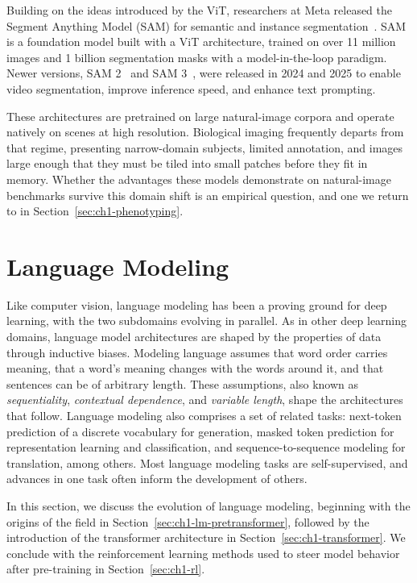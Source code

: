 Building on the ideas introduced by the ViT, researchers at Meta released the Segment Anything Model (SAM) for semantic and instance segmentation~\cite{kirillov2023segment}. SAM is a foundation model built with a ViT architecture, trained on over 11 million images and 1 billion segmentation masks with a model-in-the-loop paradigm. Newer versions, SAM 2~\cite{ravi2024sam} and SAM 3~\cite{carion2025sam3}, were released in 2024 and 2025 to enable video segmentation, improve inference speed, and enhance text prompting.

These architectures are pretrained on large natural-image corpora and operate natively on scenes at high resolution. Biological imaging frequently departs from that regime, presenting narrow-domain subjects, limited annotation, and images large enough that they must be tiled into small patches before they fit in memory. Whether the advantages these models demonstrate on natural-image benchmarks survive this domain shift is an empirical question, and one we return to in Section~\ref{sec:ch1-phenotyping}.

\section{Language Modeling}\label{sec:ch1-llms}
Like computer vision, language modeling has been a proving ground for deep learning, with the two subdomains evolving in parallel. As in other deep learning domains, language model architectures are shaped by the properties of data through inductive biases. Modeling language assumes that word order carries meaning, that a word's meaning changes with the words around it, and that sentences can be of arbitrary length. These assumptions, also known as \textit{sequentiality}, \textit{contextual dependence}, and \textit{variable length}, shape the architectures that follow. Language modeling also comprises a set of related tasks: next-token prediction of a discrete vocabulary for generation, masked token prediction for representation learning and classification, and sequence-to-sequence modeling for translation, among others. Most language modeling tasks are self-supervised, and advances in one task often inform the development of others.

In this section, we discuss the evolution of language modeling, beginning with the origins of the field in Section~\ref{sec:ch1-lm-pretransformer}, followed by the introduction of the transformer architecture in Section~\ref{sec:ch1-transformer}. We conclude with the reinforcement learning methods used to steer model behavior after pre-training in Section~\ref{sec:ch1-rl}.

